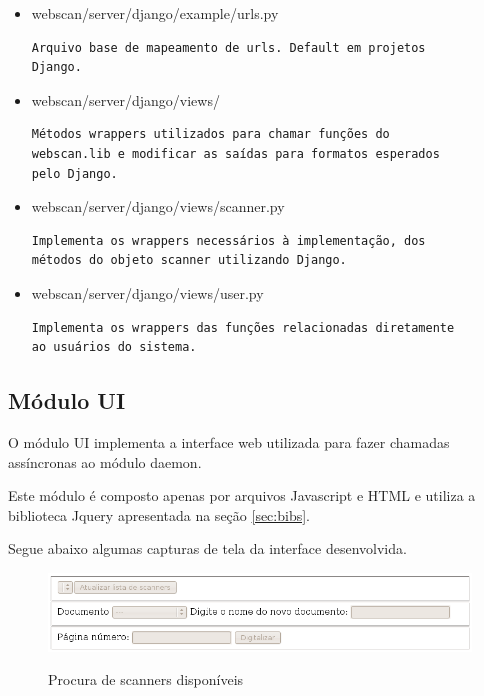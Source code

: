 \begin{itemize}
\item webscan/server/django/example/urls.py
\begin{verbatim}
Arquivo base de mapeamento de urls. Default em projetos 
Django.
\end{verbatim}

\item webscan/server/django/views/
\begin{verbatim}
Métodos wrappers utilizados para chamar funções do 
webscan.lib e modificar as saídas para formatos esperados
pelo Django.
\end{verbatim}

\item webscan/server/django/views/scanner.py
\begin{verbatim}
Implementa os wrappers necessários à implementação, dos 
métodos do objeto scanner utilizando Django.
\end{verbatim}

\item webscan/server/django/views/user.py
\begin{verbatim}
Implementa os wrappers das funções relacionadas diretamente
ao usuários do sistema.
\end{verbatim}

\end{itemize} 

\subsection{Módulo UI}
O módulo UI implementa a interface web utilizada para fazer chamadas assíncronas
ao módulo daemon. 

Este módulo é composto apenas por arquivos Javascript e HTML e utiliza a biblioteca Jquery
apresentada na seção \ref{sec:bibs}.

Segue abaixo algumas capturas de tela da interface desenvolvida.

\begin{figure}[ht]
\begin{center}
\scalebox{0.5} {
    \includegraphics{imagens/lista_scanners.png}}
\end{center}
  \caption{Procura de scanners disponíveis}
  \label{fig:urls}
\end{figure}

